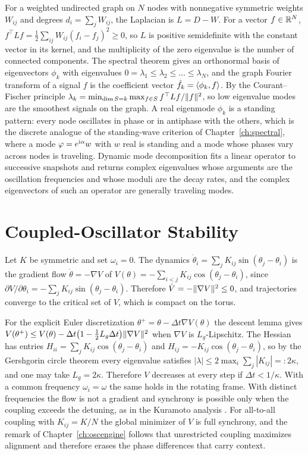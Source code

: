 For a weighted undirected graph on $N$ nodes with nonnegative symmetric weights $W_{ij}$ and degrees $d_i=\sum_jW_{ij}$, the Laplacian is $L=D-W$. For a vector $f\in\mathbb{R}^N$, $f^\top Lf=\tfrac12\sum_{ij}W_{ij}(f_i-f_j)^2\ge0$, so $L$ is positive semidefinite with the constant vector in its kernel, and the multiplicity of the zero eigenvalue is the number of connected components. The spectral theorem gives an orthonormal basis of eigenvectors $\phi_k$ with eigenvalues $0=\lambda_1\le\lambda_2\le\dots\le\lambda_N$, and the graph Fourier transform of a signal $f$ is the coefficient vector $\hat f_k=\langle \phi_k,f\rangle$. By the Courant--Fischer principle $\lambda_k=\min_{\dim S=k}\max_{f\in S}f^\top Lf/\lVert f\rVert^2$, so low eigenvalue modes are the smoothest signals on the graph. A real eigenmode $\phi_k$ is a standing pattern: every node oscillates in phase or in antiphase with the others, which is the discrete analogue of the standing-wave criterion of Chapter~\ref{ch:spectral}, where a mode $\varphi=e^{\mathrm{i}\alpha}w$ with $w$ real is standing and a mode whose phases vary across nodes is traveling. Dynamic mode decomposition fits a linear operator to successive snapshots and returns complex eigenvalues whose arguments are the oscillation frequencies and whose moduli are the decay rates, and the complex eigenvectors of such an operator are generally traveling modes.

\chapter{Coupled-Oscillator Stability}\label{app:osc}

Let $K$ be symmetric and set $\omega_i=0$. The dynamics $\dot\theta_i=\sum_jK_{ij}\sin(\theta_j-\theta_i)$ is the gradient flow $\dot\theta=-\nabla V$ of $V(\theta)=-\sum_{i<j}K_{ij}\cos(\theta_j-\theta_i)$, since $\partial V/\partial\theta_i=-\sum_jK_{ij}\sin(\theta_j-\theta_i)$. Therefore $\dot V=-\lVert \nabla V\rVert^2\le0$, and trajectories converge to the critical set of $V$, which is compact on the torus.

For the explicit Euler discretization $\theta^+=\theta-\Delta t\nabla V(\theta)$ the descent lemma gives $V(\theta^+)\le V(\theta)-\Delta t\bigl(1-\tfrac12L_g\Delta t\bigr)\lVert \nabla V\rVert^2$ when $\nabla V$ is $L_g$-Lipschitz. The Hessian has entries $H_{ii}=\sum_jK_{ij}\cos(\theta_j-\theta_i)$ and $H_{ij}=-K_{ij}\cos(\theta_j-\theta_i)$, so by the Gershgorin circle theorem every eigenvalue satisfies $|\lambda|\le2\max_i\sum_j|K_{ij}|=:2\kappa$, and one may take $L_g=2\kappa$. Therefore $V$ decreases at every step if $\Delta t<1/\kappa$. With a common frequency $\omega_i=\omega$ the same holds in the rotating frame. With distinct frequencies the flow is not a gradient and synchrony is possible only when the coupling exceeds the detuning, as in the Kuramoto analysis \cite{kuramoto1984,acebron2005}. For all-to-all coupling with $K_{ij}=K/N$ the global minimizer of $V$ is full synchrony, and the remark of Chapter~\ref{ch:oscengine} follows that unrestricted coupling maximizes alignment and therefore erases the phase differences that carry context.

